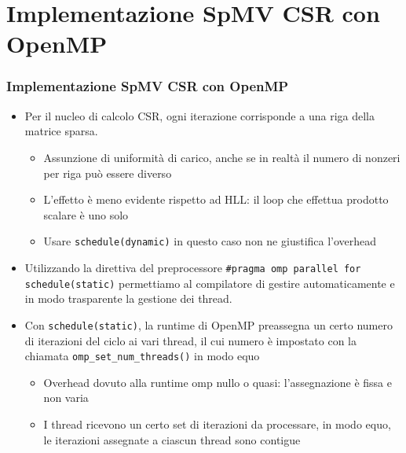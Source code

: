\documentclass{beamer}
\begin{document}
\section{Implementazione SpMV CSR con OpenMP}
\begin{frame}
    \frametitle{Implementazione SpMV CSR con OpenMP}
    \begin{itemize}    
    	\item Per il nucleo di calcolo CSR, ogni 
    	iterazione corrisponde a una riga della matrice sparsa.
    	
    	\begin{itemize}
    		\item Assunzione di uniformità di carico, anche se in realtà il numero di
    		nonzeri per riga può essere diverso
    		\item L'effetto è meno evidente rispetto ad HLL: il loop che effettua prodotto
    		scalare è uno solo
    		\item Usare \texttt{schedule(dynamic)} in questo caso non ne giustifica l'overhead 
    	\end{itemize}
    	
    	\item Utilizzando la direttiva del preprocessore
    	\texttt{\#pragma omp parallel for schedule(static)}
    	permettiamo al compilatore di gestire automaticamente e in modo
    	trasparente la gestione dei thread.
    	
    	\item Con \texttt{schedule(static)}, la runtime di OpenMP preassegna un certo
    	numero di iterazioni del ciclo ai vari thread, il cui numero è impostato
    	con la chiamata \texttt{omp\_set\_num\_threads()} in modo equo
    	
    	\begin{itemize}
    		\item Overhead dovuto alla runtime omp nullo o quasi: 
    		l'assegnazione è fissa e non varia
    		\item I thread ricevono un certo set di iterazioni da processare, in modo equo,
    		le iterazioni assegnate a ciascun thread sono contigue
    	\end{itemize}
    \end{itemize}
    
\end{frame}
\end{document}
